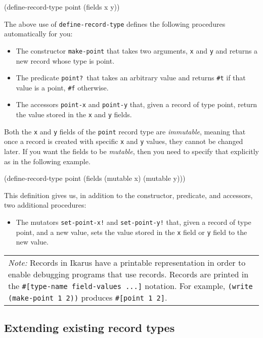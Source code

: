 \documentclass[onecolumn, 12pt, twoside, openright, dvipdfm]{book}
\newcommand{\BoxedText}[2]{
  \vspace{.05in}
  \begin{center}
    \begin{tabular}{|p{4.6in}|} {\large \emph{#1}} #2 \end{tabular}
  \end{center}
  \vspace{.05in}
}
\begin{document}
\begin{CodeInline}
(define-record-type point
  (fields x y))
\end{CodeInline}

The above use of \texttt{define-record-type} defines the following
procedures automatically for you:
\begin{itemize}
\item The constructor \texttt{make-point} that takes two arguments,
\texttt{x} and \texttt{y} and returns a new record whose type is
point.
\item The predicate \texttt{point?}\ that takes an arbitrary value
and returns \texttt{\#t} if that value is a point, \texttt{\#f}
otherwise. 
\item The accessors \texttt{point-x} and \texttt{point-y} that,
given a record of type point, return the value stored in the
\texttt{x} and \texttt{y} fields.
\end{itemize}

Both the \texttt{x} and \texttt{y} fields of the \texttt{point}
record type are \emph{immutable}, meaning that once a record is
created with specific \texttt{x} and \texttt{y} values, they cannot
be changed later.  If you want the fields to be \emph{mutable}, then
you need to specify that explicitly as in the following example.
\newpage

\begin{CodeInline}
(define-record-type point
  (fields (mutable x) (mutable y)))
\end{CodeInline}

This definition gives us, in addition to the constructor, predicate,
and accessors, two additional procedures:
\begin{itemize}
\item The mutators \texttt{set-point-x!} and \texttt{set-point-y!} that,
given a record of type point, and a new value, sets the value stored in the
\texttt{x} field or \texttt{y} field to the new value.
\end{itemize}


\BoxedText{Note:}{Records in Ikarus have a printable representation
in order to enable debugging programs that use records.  Records are
printed in the \texttt{\#[type-name field-values ...]} notation.
For example, \texttt{(write (make-point 1 2))} produces 
\texttt{\#[point 1 2]}.}

\subsection{Extending existing record types}
\end{document}
